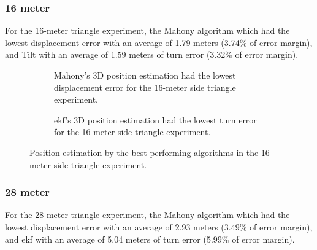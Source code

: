 \newpage

\subsubsection{16 meter}

For the 16-meter triangle experiment, the Mahony algorithm which had the lowest displacement error with an average of 1.79 meters (3.74\% of error margin), and Tilt with an average of 1.59 meters of turn error (3.32\% of error margin).

\vspace{-0.5cm}

\vspace{-1.5cm}

\begin{figure}[H]
    \centering
    \begin{subfigure}{0.49\textwidth}
        \centering
        \resizebox{1\linewidth}{!}{}
        \caption{Mahony's 3D position estimation had the lowest displacement error for the 16-meter side triangle experiment.}
        \label{fig:triangle16_2D}
    \end{subfigure}
    \begin{subfigure}{0.49\textwidth}
        \centering
        \resizebox{1\linewidth}{!}{}
        \caption{\acrshort{ekf}'s 3D position estimation had the lowest turn error for the 16-meter side triangle experiment.}
        \label{fig:triangle16_3D}
    \end{subfigure}
    \caption{Position estimation by the best performing algorithms in the 16-meter side triangle experiment.}
    \label{fig:triangle16}
\end{figure}

\subsubsection{28 meter}

For the 28-meter triangle experiment, the Mahony algorithm which had the lowest displacement error with an average of 2.93 meters (3.49\% of error margin), and \acrshort{ekf} with an average of 5.04 meters of turn error (5.99\% of error margin).

\vspace{-0.5cm}

\vspace{-1.5cm}

